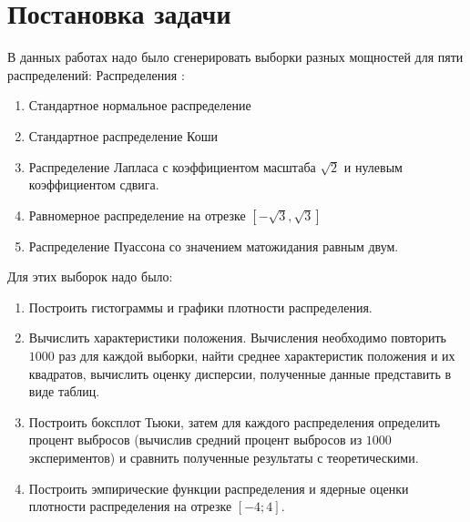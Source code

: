 \documentclass[a4]{article}
\renewcommand{\listoffigures}{\begingroup %
\tocsection
\tocfile{\listfigurename}{lof}
\endgroup}
\renewcommand{\listoftables}{\begingroup %
\tocsection
\tocfile{\listtablename}{lot}
\endgroup}
\begin{document}
\newpage
\pagestyle{plain}




\newpage
\tableofcontents{}
\newpage
\listoffigures{}
\listoftables{}
\newpage

\section{Постановка задачи}
В данных работах надо было сгенерировать выборки разных мощностей для пяти распределений:
Распределения \cite{distr_formulas}:
\begin{enumerate}
\item Стандартное нормальное распределение
\item Стандартное распределение Коши
\item Распределение Лапласа с коэффициентом масштаба $\sqrt{2}$ и нулевым коэффициентом сдвига.
\item Равномерное распределение на отрезке $\left[-\sqrt{3}, \sqrt{3}\right]$
\item Распределение Пуассона со значением матожидания равным двум.
\end{enumerate}

Для этих выборок надо было:
\begin{enumerate}
    \item Построить гистограммы и графики плотности распределения.
    \item Вычислить характеристики положения. Вычисления необходимо повторить $1000$ раз для каждой выборки, найти среднее характеристик положения и их квадратов, вычислить оценку дисперсии, полученные данные представить в виде таблиц.
    \item Построить боксплот Тьюки, затем для каждого распределения определить процент выбросов (вычислив средний процент выбросов из $1000$ экспериментов) и сравнить полученные результаты с теоретическими.
    \item Построить эмпирические функции распределения и ядерные оценки плотности распределения на отрезке $[-4;4].$	
\end{enumerate}
\end{document}
